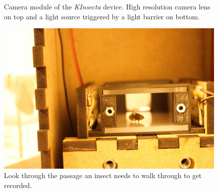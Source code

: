\begin{figure}[!ht]
    \centering
    \begin{minipage}{\textwidth}
        \centering
        \caption{Camera module of the \textit{KInsecta} device. High resolution camera lens on top and a light source triggered by a light barrier on bottom.}
        \label{fig:camera}
    \end{minipage}
\end{figure}
\begin{figure}[!ht]
    \begin{minipage}{\textwidth}
        \centering
        \includegraphics[width=\textwidth,keepaspectratio]{images/camera-look-through.JPG}
        \caption{Look through the passage an insect needs to walk through to get recorded.}
        \label{fig:camera-look-through}
    \end{minipage}
\end{figure}
